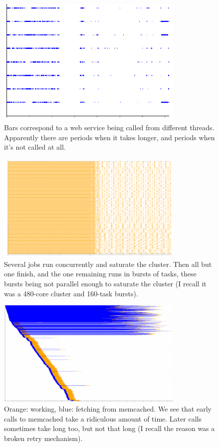 \documentclass{article}
\begin{document}
\begin{figure}[p]
\center
\includegraphics[width=0.8\textwidth]{pics/splot/8threads.png}
\caption{Bars correspond to a web service being called from different threads. Apparently there are periods when it takes longer, and periods when it's not called at all.}
\end{figure}

\begin{figure}[p]
\center
\includegraphics[width=0.8\textwidth]{pics/splot/njobs-then-one.png}
\caption{Several jobs run concurrently and saturate the cluster. Then all but one finish, and the one remaining runs in bursts of tasks, these bursts being not parallel enough to saturate the cluster (I recall it was a 480-core cluster and 160-task bursts).}
\end{figure}

\begin{figure}[p]
\center
\includegraphics[width=0.8\textwidth]{pics/splot/very-slow-memcached.png}
\caption{Orange: working, blue: fetching from memcached. We see that early calls to memcached take a ridiculous amount of time. Later calls sometimes take long too, but not that long (I recall the reason was a broken retry mechanism).}
\end{figure}
\end{document}
